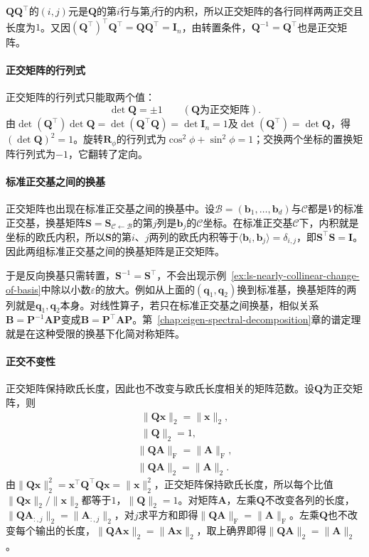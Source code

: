$\bm Q\bm Q^\top$的$(i,j)$元是$\bm Q$的第$i$行与第$j$行的内积，所以正交矩阵的各行同样两两正交且长度为$1$。又因$(\bm Q^\top)^\top\bm Q^\top=\bm Q\bm Q^\top=\bm I_n$，由转置条件，$\bm Q^{-1}=\bm Q^\top$也是正交矩阵。

\paragraph{正交矩阵的行列式}
正交矩阵的行列式只能取两个值：
\[
 \det\bm Q=\pm1\qquad(\bm Q\text{为正交矩阵}).
\]
由$\det(\bm Q^\top)\det\bm Q=\det(\bm Q^\top\bm Q)=\det\bm I_n=1$及$\det(\bm Q^\top)=\det\bm Q$，得$(\det\bm Q)^2=1$。旋转$\bm R_\phi$的行列式为$\cos^2\phi+\sin^2\phi=1$；交换两个坐标的置换矩阵行列式为$-1$，它翻转了定向。

\paragraph{标准正交基之间的换基}
正交矩阵也出现在标准正交基之间的换基中。设$\mathcal B=(\bm b_1,\ldots,\bm b_d)$与$\mathcal C$都是$V$的标准正交基，换基矩阵$\bm S=\bm S_{\mathcal C\leftarrow\mathcal B}$的第$j$列是$\bm b_j$的$\mathcal C$坐标。在标准正交基$\mathcal C$下，内积就是坐标的欧氏内积，所以$\bm S$的第$i$、$j$两列的欧氏内积等于$\langle\bm b_i,\bm b_j\rangle=\delta_{i,j}$，即$\bm S^\top\bm S=\bm I$。因此两组标准正交基之间的换基矩阵是正交矩阵。

于是反向换基只需转置，$\bm S^{-1}=\bm S^\top$，不会出现示例~\ref{ex:ls-nearly-collinear-change-of-basis}中除以小数$\varepsilon$的放大。例如从上面的$(\bm q_1,\bm q_2)$换到标准基，换基矩阵的两列就是$\bm q_1,\bm q_2$本身。对线性算子，若只在标准正交基之间换基，相似关系$\bm B=\bm P^{-1}\bm A\bm P$变成$\bm B=\bm P^\top\bm A\bm P$。第~\ref{chap:eigen-spectral-decomposition}章的谱定理就是在这种受限的换基下化简对称矩阵。

\paragraph{正交不变性}
正交矩阵保持欧氏长度，因此也不改变与欧氏长度相关的矩阵范数。设$\bm Q$为正交矩阵，则
\[
 \begin{gathered}
 \lVert\bm Q\bm x\rVert_2=\lVert\bm x\rVert_2,\\
 \lVert\bm Q\rVert_2=1,
 \end{gathered}
\]
\[
 \begin{gathered}
 \lVert\bm Q\bm A\rVert_{\mathrm F}=\lVert\bm A\rVert_{\mathrm F},\\
 \lVert\bm Q\bm A\rVert_2=\lVert\bm A\rVert_2.
 \end{gathered}
\]
由$\lVert\bm Q\bm x\rVert_2^2=\bm x^\top\bm Q^\top\bm Q\bm x=\lVert\bm x\rVert_2^2$，正交矩阵保持欧氏长度，所以每个比值$\lVert\bm Q\bm x\rVert_2/\lVert\bm x\rVert_2$都等于$1$，$\lVert\bm Q\rVert_2=1$。对矩阵$\bm A$，左乘$\bm Q$不改变各列的长度，$\lVert\bm Q\bm A_{:,j}\rVert_2=\lVert\bm A_{:,j}\rVert_2$，对$j$求平方和即得$\lVert\bm Q\bm A\rVert_{\mathrm F}=\lVert\bm A\rVert_{\mathrm F}$。左乘$\bm Q$也不改变每个输出的长度，$\lVert\bm Q\bm A\bm x\rVert_2=\lVert\bm A\bm x\rVert_2$，取上确界即得$\lVert\bm Q\bm A\rVert_2=\lVert\bm A\rVert_2$。

